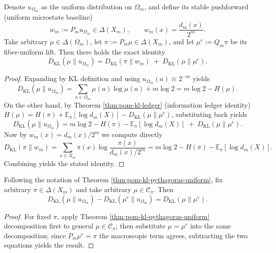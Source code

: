 \begin{theorem}\label{thm:pom-kl-pythagoras-uniform}
Denote $u_{\Omega_m}$ as the uniform distribution on $\Omega_m$, and define its stable pushforward (uniform microstate baseline)
\[
w_m:=P_m u_{\Omega_m}\in\Delta(X_m),\qquad
w_m(x)=\frac{d_m(x)}{2^m}.
\]
Take arbitrary $\mu\in\Delta(\Omega_m)$, let $\pi:=P_m\mu\in\Delta(X_m)$, and let $\mu^e:=Q_m\pi$ be its fiber-uniform lift.
Then there holds the exact identity
\[
\boxed{\;
D_{\mathrm{KL}}(\mu\|u_{\Omega_m})
=D_{\mathrm{KL}}(\pi\|w_m)\;+\;D_{\mathrm{KL}}(\mu\|\mu^e).
\;}
\]
\end{theorem}
\begin{proof}
Expanding by KL definition and using $u_{\Omega_m}(a)\equiv 2^{-m}$ yields
\[
D_{\mathrm{KL}}(\mu\|u_{\Omega_m})
=\sum_{a\in\Omega_m}\mu(a)\log\mu(a)+m\log 2
=m\log 2-H(\mu).
\]
On the other hand, by Theorem \ref{thm:pom-kl-ledger} (information ledger identity)
\(
H(\mu)=H(\pi)+\mathbb{E}_\pi[\log d_m(X)]-D_{\mathrm{KL}}(\mu\|\mu^e)
\),
substituting back yields
\[
D_{\mathrm{KL}}(\mu\|u_{\Omega_m})
=m\log 2-H(\pi)-\mathbb{E}_\pi[\log d_m(X)]\;+\;D_{\mathrm{KL}}(\mu\|\mu^e).
\]
Now by $w_m(x)=d_m(x)/2^m$ we compute directly
\[
D_{\mathrm{KL}}(\pi\|w_m)
=\sum_{x\in X_m}\pi(x)\log\frac{\pi(x)}{d_m(x)/2^m}
=m\log 2-H(\pi)-\mathbb{E}_\pi[\log d_m(X)].
\]
Combining yields the stated identity.
\end{proof}

\begin{corollary}\label{cor:pom-Iproj-gap-exact}
Following the notation of Theorem \ref{thm:pom-kl-pythagoras-uniform}, fix arbitrary $\pi\in\Delta(X_m)$ and take arbitrary $\mu\in\mathcal{C}_\pi$.
Then
\[
\boxed{\;
D_{\mathrm{KL}}(\mu\|u_{\Omega_m})-D_{\mathrm{KL}}(\mu^e\|u_{\Omega_m})
=D_{\mathrm{KL}}(\mu\|\mu^e).
\;}
\]
\end{corollary}
\begin{proof}
For fixed $\pi$, apply Theorem \ref{thm:pom-kl-pythagoras-uniform} decomposition first to general $\mu\in\mathcal{C}_\pi$;
then substitute $\mu=\mu^e$ into the same decomposition; since $P_m\mu^e=\pi$ the macroscopic term agrees, subtracting the two equations yields the result.
\end{proof}

